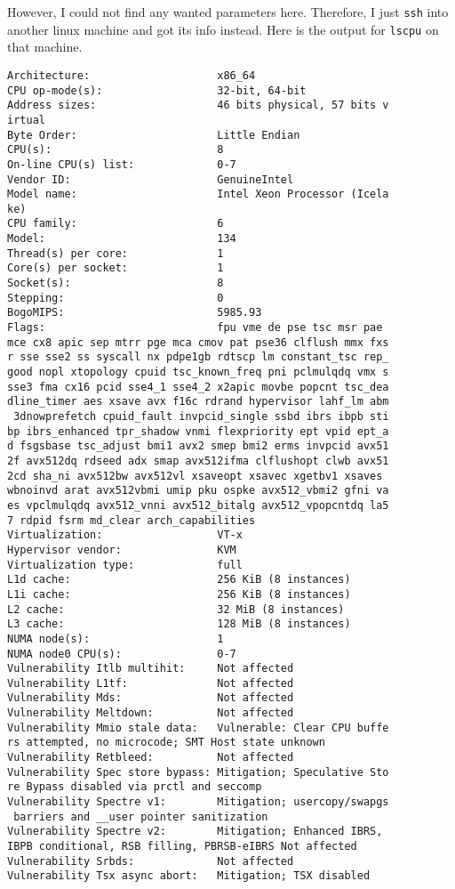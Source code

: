 \documentclass[11pt]{article}
\begin{document}
However, I could not find any wanted parameters here. Therefore, I just \texttt{ssh}
into another linux machine and got its info instead. Here is the output for
\texttt{lscpu} on that machine.
\begin{verbatim}
Architecture:                    x86_64
CPU op-mode(s):                  32-bit, 64-bit
Address sizes:                   46 bits physical, 57 bits v
irtual
Byte Order:                      Little Endian
CPU(s):                          8
On-line CPU(s) list:             0-7
Vendor ID:                       GenuineIntel
Model name:                      Intel Xeon Processor (Icela
ke)
CPU family:                      6
Model:                           134
Thread(s) per core:              1
Core(s) per socket:              1
Socket(s):                       8
Stepping:                        0
BogoMIPS:                        5985.93
Flags:                           fpu vme de pse tsc msr pae 
mce cx8 apic sep mtrr pge mca cmov pat pse36 clflush mmx fxs
r sse sse2 ss syscall nx pdpe1gb rdtscp lm constant_tsc rep_
good nopl xtopology cpuid tsc_known_freq pni pclmulqdq vmx s
sse3 fma cx16 pcid sse4_1 sse4_2 x2apic movbe popcnt tsc_dea
dline_timer aes xsave avx f16c rdrand hypervisor lahf_lm abm
 3dnowprefetch cpuid_fault invpcid_single ssbd ibrs ibpb sti
bp ibrs_enhanced tpr_shadow vnmi flexpriority ept vpid ept_a
d fsgsbase tsc_adjust bmi1 avx2 smep bmi2 erms invpcid avx51
2f avx512dq rdseed adx smap avx512ifma clflushopt clwb avx51
2cd sha_ni avx512bw avx512vl xsaveopt xsavec xgetbv1 xsaves 
wbnoinvd arat avx512vbmi umip pku ospke avx512_vbmi2 gfni va
es vpclmulqdq avx512_vnni avx512_bitalg avx512_vpopcntdq la5
7 rdpid fsrm md_clear arch_capabilities
Virtualization:                  VT-x
Hypervisor vendor:               KVM
Virtualization type:             full
L1d cache:                       256 KiB (8 instances)
L1i cache:                       256 KiB (8 instances)
L2 cache:                        32 MiB (8 instances)
L3 cache:                        128 MiB (8 instances)
NUMA node(s):                    1
NUMA node0 CPU(s):               0-7
Vulnerability Itlb multihit:     Not affected
Vulnerability L1tf:              Not affected
Vulnerability Mds:               Not affected
Vulnerability Meltdown:          Not affected
Vulnerability Mmio stale data:   Vulnerable: Clear CPU buffe
rs attempted, no microcode; SMT Host state unknown
Vulnerability Retbleed:          Not affected
Vulnerability Spec store bypass: Mitigation; Speculative Sto
re Bypass disabled via prctl and seccomp
Vulnerability Spectre v1:        Mitigation; usercopy/swapgs
 barriers and __user pointer sanitization
Vulnerability Spectre v2:        Mitigation; Enhanced IBRS, 
IBPB conditional, RSB filling, PBRSB-eIBRS Not affected
Vulnerability Srbds:             Not affected
Vulnerability Tsx async abort:   Mitigation; TSX disabled
\end{verbatim}
\end{document}

